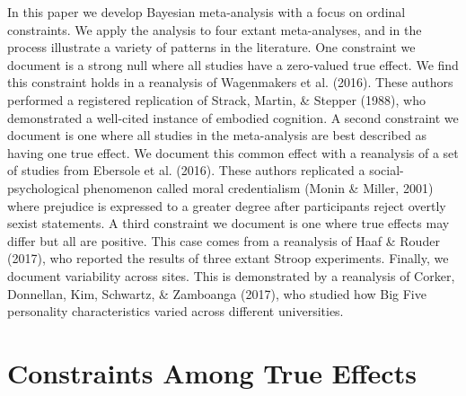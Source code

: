 \documentclass[english,man]{apa6}
\newcounter{author}
\theoremstyle{definition}
\theoremstyle{definition}
\theoremstyle{remark}
\begin{document}
In this paper we develop Bayesian meta-analysis with a focus on ordinal
constraints. We apply the analysis to four extant meta-analyses, and in
the process illustrate a variety of patterns in the literature. One
constraint we document is a strong null where all studies have a
zero-valued true effect. We find this constraint holds in a reanalysis
of Wagenmakers et al. (2016). These authors performed a registered
replication of Strack, Martin, \& Stepper (1988), who demonstrated a
well-cited instance of embodied cognition. A second constraint we
document is one where all studies in the meta-analysis are best
described as having one true effect. We document this common effect with
a reanalysis of a set of studies from Ebersole et al. (2016). These
authors replicated a social-psychological phenomenon called moral
credentialism (Monin \& Miller, 2001) where prejudice is expressed to a
greater degree after participants reject overtly sexist statements. A
third constraint we document is one where true effects may differ but
all are positive. This case comes from a reanalysis of Haaf \& Rouder
(2017), who reported the results of three extant Stroop experiments.
Finally, we document variability across sites. This is demonstrated by a
reanalysis of Corker, Donnellan, Kim, Schwartz, \& Zamboanga (2017), who
studied how Big Five personality characteristics varied across different
universities.

\section{Constraints Among True
Effects}\label{constraints-among-true-effects}
\end{document}
